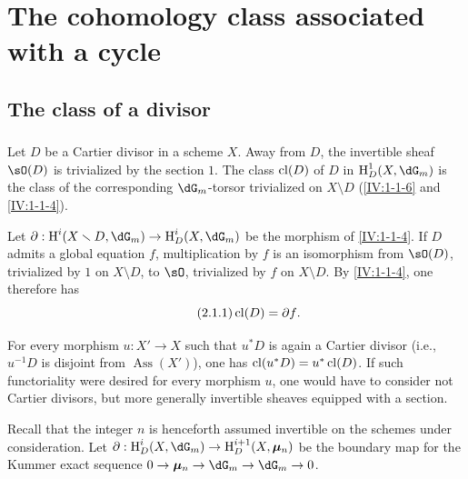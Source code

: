 \section{The cohomology class associated with a cycle}\label{IV:2}










\subsection{The class of a divisor}\label{IV:2-1}






\subsubsection{}\label{IV:2-1-1}

Let $D$ be a Cartier divisor in a scheme $X$. Away from $D$, the invertible
sheaf $\sO(D)$ is trivialized by the section $1$. The class $\operatorname{cl}(D)$ of $D$
in $\h_D^1(X,\dG_m)$ is the class of the corresponding $\dG_m$-torsor
trivialized on $X\setminus D$ (\ref{IV:1-1-6} and \ref{IV:1-1-4}).

Let $\partial:\h^i(X\setminus D,\dG_m)\to \h_D^i(X,\dG_m)$ be the morphism
of \ref{IV:1-1-4}. If $D$ admits a global equation $f$, multiplication by
$f$ is an isomorphism from $\sO(D)$, trivialized by $1$ on $X\setminus D$,
to $\sO$, trivialized by $f$ on $X\setminus D$. By \ref{IV:1-1-4}, one
therefore has
\begin{equation*}\tag{2.1.1}\label{IV:eq:2-1-1}
  \operatorname{cl}(D) = \partial f \text{.}
\end{equation*}

For every morphism $u:X'\to X$ such that $u^* D$ is again a Cartier divisor
(i.e., $u^{-1} D$ is disjoint from $\operatorname{Ass}(X')$), one has
$\operatorname{cl}(u^* D) = u^*\operatorname{cl}(D)$. If such functoriality were desired for every
morphism $u$, one would have to consider not Cartier divisors, but more
generally invertible sheaves equipped with a section.

Recall that the integer $n$ is henceforth assumed invertible on the schemes
under consideration. Let
$\partial:\h_D^i(X,\dG_m) \to \h_D^{i+1}(X,\dmu_n)$ be the boundary map for
the Kummer exact sequence $0 \to \dmu_n \to \dG_m \to \dG_m \to 0$.






